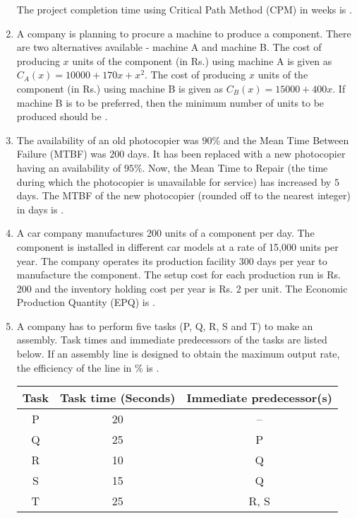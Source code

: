 \documentclass[journal,12pt,onecolumn]{IEEEtran}
\theoremstyle{remark}
\begin{document}
\begin{enumerate}
The project completion time using Critical Path Method (CPM) in weeks is \underline{\hspace{2cm}}.
\vspace{1cm}
\item A company is planning to procure a machine to produce a component. There are two alternatives available - machine A and machine B. The cost of producing $x$ units of the component (in Rs.) using machine A is given as $C_A(x) = 10000 + 170x + x^2$. The cost of producing $x$ units of the component (in Rs.) using machine B is given as $C_B(x) = 15000 + 400x$. If machine B is to be preferred, then the minimum number of units to be produced should be \underline{\hspace{2cm}}.

\vspace{1cm}

\item The availability of an old photocopier was $90\%$ and the Mean Time Between Failure (MTBF) was $200$ days. It has been replaced with a new photocopier having an availability of $95\%$. Now, the Mean Time to Repair (the time during which the photocopier is unavailable for service) has increased by $5$ days. The MTBF of the new photocopier (rounded off to the nearest integer) in days is \underline{\hspace{2cm}}.

\vspace{1cm}

\item A car company manufactures 200 units of a component per day. The component is installed in different car models at a rate of 15,000 units per year. The company operates its production facility 300 days per year to manufacture the component. The setup cost for each production run is Rs. 200 and the inventory holding cost per year is Rs. 2 per unit. The Economic Production Quantity (EPQ) is \underline{\hspace{2cm}}.

\vspace{1cm}
\newpage
\item A company has to perform five tasks (P, Q, R, S and T) to make an assembly. Task times and immediate predecessors of the tasks are listed below. If an assembly line is designed to obtain the maximum output rate, the efficiency of the line in \% is \underline{\hspace{2cm}}.

\begin{center}
\begin{tabular}{|c|c|c|}
\hline
Task & Task time (Seconds) & Immediate predecessor(s) \\
\hline
P & 20 & -- \\
Q & 25 & P \\
R & 10 & Q \\
S & 15 & Q \\
T & 25 & R, S \\
\hline
\end{tabular}
\end{center}


\end{enumerate}
\end{document}
